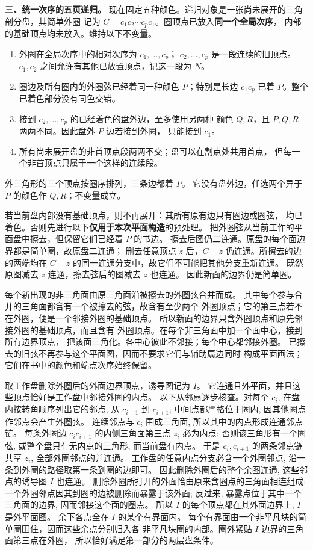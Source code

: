 \begin{solution}
\medskip
\noindent\textbf{三、统一次序的五页递归。}
现在固定五种颜色。递归对象是一张尚未展开的三角剖分盘，其简单外圈
记为 $C=c_1c_2\cdots c_pc_1$。圈顶点已放入\textbf{同一个全局次序}，
内部的基础顶点均未放入。维持以下不变量。
\begin{enumerate}
\item 外圈在全局次序中的相对次序为 $c_1,\ldots,c_p$；
  $c_2,\ldots,c_p$ 是一段连续的旧顶点。
  $c_1,c_2$ 之间允许有其他已放置顶点，记这一段为 $N$。
\item 圈边及所有圈内的外圈弦已经着同一种颜色 $P$；特别是长边
  $c_1c_p$ 已着 $P$。整个已着色部分没有同色交错。
\item 接到 $c_2,\ldots,c_p$ 的已经着色的盘外边，至多使用另两种
  颜色 $Q,R$，且 $P,Q,R$ 两两不同。因此盘外 $P$ 边若接到外圈，
  只能接到 $c_1$。
\item 所有尚未展开盘的非首顶点段两两不交；盘可以在割点处共用首点，
  但每一个非首顶点只属于一个这样的连续段。
\end{enumerate}
外三角形的三个顶点按圈序排列，三条边都着 $P$。
它没有盘外边，任选两个异于 $P$ 的颜色作 $Q,R$；不变量成立。

若当前盘内部没有基础顶点，则不再展开：其所有原有边只有圈边或圈弦，
均已着色。否则先进行以下\textbf{仅用于本次平面构造}的预处理。
把外圈弦从当前工作的平面盘中擦去，但保留它们已经着 $P$ 的书边。
擦去后图仍二连通。原盘的每个面边界都是简单圈，故原盘二连通；
删去任意顶点 $z$ 后，$C-z$ 仍连通。所擦去的边的两端均在 $C-z$
的同一连通分支中，故它们不可能把其他分支重新连通。
既然原图减去 $z$ 连通，擦去弦后的图减去 $z$ 也连通。
因此新面的边界仍是简单圈。

每个新出现的非三角面由原三角面沿被擦去的外圈弦合并而成。
其中每个参与合并的三角面都含有一个被擦去的弦，故含有至少两个
外圈顶点；它的第三点若不在外圈，便是一个邻接外圈的基础顶点。
所以新面的边界只含外圈顶点和原先邻接外圈的基础顶点，而且含有
外圈顶点。在每个非三角面中加一个面中心，接到所有边界顶点，
把该面三角化。各中心彼此不邻接；每个中心都邻接外圈。
已擦去的旧弦不再参与这个平面图，因而不要求它们与辅助扇边同时
构成平面画法；它们在书中的颜色和端点次序始终保留。

取工作盘删除外圈后的外面边界顶点，诱导图记为 $I$。
它连通且外平面，并且这些顶点恰好是工作盘中邻接外圈的内点。
以下从邻扇逐步核查。对每个 $c_i$, 在盘内按转角顺序列出它的邻点,
从 $c_{i-1}$ 到 $c_{i+1}$; 中间点都严格位于圈内, 因其他圈点作邻点会产生外圈弦。
连续邻点与 $c_i$ 围成三角面, 所以其中的内点形成连通邻点链。
每条外圈边 $c_ic_{i+1}$ 的内侧三角面第三点 $z_i$ 必为内点:
否则该三角形有一个圈弦, 或整个盘只有无内点的三角形, 而当前盘有内点。
于是 $c_i,c_{i+1}$ 的两条邻点链共享 $z_i$, 全部外圈邻点的并连通。
工作盘的任意内点分支必含一个外圈邻点, 沿一条到外圈的路径取第一条到圈的边即可。
因此删除外圈后的整个余图连通, 这些邻点的诱导图 $I$ 也连通。
删除外圈所打开的外面恰由原来含圈点的三角面相连组成:
一个外圈邻点因其到圈的边被删除而暴露于该外面;
反过来, 暴露点位于其中一个三角面的边界, 因而邻接这个面的圈点。
所以 $I$ 的每个顶点都在其外面边界上, $I$ 是外平面图。
余下各点全在 $I$ 的某个有界面内。
每个有界面由一个非平凡块的简单圈围住，因而这些余点分别归入各
非平凡块圈的内部。圈外紧贴 $I$ 边界的三角面第三点在外圈，
所以恰好满足第一部分的两层盘条件。


\end{solution}
